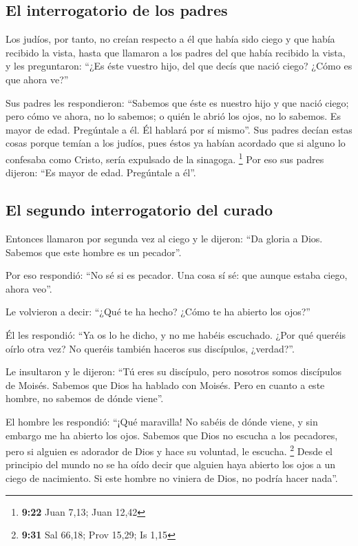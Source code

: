 \begin{paracol}{2}
\hypertarget{el-interrogatorio-de-los-padres}{%
\subsection{El interrogatorio de los
padres}\label{el-interrogatorio-de-los-padres}}

 Los judíos, por tanto, no creían respecto a él que había
sido ciego y que había recibido la vista, hasta que llamaron a los
padres del que había recibido la vista,  y les
preguntaron: ``¿Es éste vuestro hijo, del que decís que nació ciego?
¿Cómo es que ahora ve?''

 Sus padres les respondieron: ``Sabemos que éste es
nuestro hijo y que nació ciego;  pero cómo ve ahora, no
lo sabemos; o quién le abrió los ojos, no lo sabemos. Es mayor de edad.
Pregúntale a él. Él hablará por sí mismo''.  Sus padres
decían estas cosas porque temían a los judíos, pues éstos ya habían
acordado que si alguno lo confesaba como Cristo, sería expulsado de la
sinagoga. \footnote{\textbf{9:22} Juan 7,13; Juan 12,42} 
Por eso sus padres dijeron: ``Es mayor de edad. Pregúntale a él''.

\hypertarget{el-segundo-interrogatorio-del-curado}{%
\subsection{El segundo interrogatorio del
curado}\label{el-segundo-interrogatorio-del-curado}}

 Entonces llamaron por segunda vez al ciego y le dijeron:
``Da gloria a Dios. Sabemos que este hombre es un pecador''.

 Por eso respondió: ``No sé si es pecador. Una cosa sí
sé: que aunque estaba ciego, ahora veo''.

 Le volvieron a decir: ``¿Qué te ha hecho? ¿Cómo te ha
abierto los ojos?''

 Él les respondió: ``Ya os lo he dicho, y no me habéis
escuchado. ¿Por qué queréis oírlo otra vez? No queréis también haceros
sus discípulos, ¿verdad?''.

 Le insultaron y le dijeron: ``Tú eres su discípulo, pero
nosotros somos discípulos de Moisés.  Sabemos que Dios ha
hablado con Moisés. Pero en cuanto a este hombre, no sabemos de dónde
viene''.

 El hombre les respondió: ``¡Qué maravilla! No sabéis de
dónde viene, y sin embargo me ha abierto los ojos. 
Sabemos que Dios no escucha a los pecadores, pero si alguien es adorador
de Dios y hace su voluntad, le escucha. \footnote{\textbf{9:31} Sal
  66,18; Prov 15,29; Is 1,15}  Desde el principio del
mundo no se ha oído decir que alguien haya abierto los ojos a un ciego
de nacimiento.  Si este hombre no viniera de Dios, no
podría hacer nada''.


\end{paracol}
